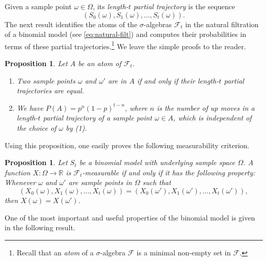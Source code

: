 \documentclass[11pt, openany, oneside]{book}
\newtheorem{prop}[thm]{Proposition}
\theoremstyle{definition}
\theoremstyle{remark}
\theoremstyle{boldital}
\numberwithin{equation}{section}
\begin{document}
Given a sample point $\omega\in \Omega$, its \textit{length-$t$ partial trajectory} is the sequence
	\[
	(S_0(\omega), S_1(\omega),\ldots,S_t(\omega)).
	\]
The next result identifies the atoms of the $\sigma$-algebras $\mathcal{F}_t$ in the natural filtration of a binomial model (see \eqref{eq:natural-filt}) and computes their probabilities in terms of these partial trajectories.\footnote{Recall that an \textit{atom} of a $\sigma$-algebra $\mathcal{F}$ is a minimal non-empty set in $\mathcal{F}$.} We leave the simple proofs to the reader.

\begin{prop}\label{prop:atom-prob}
Let $A$ be an atom of $\mathcal{F}_t$.
\begin{enumerate}
\item Two sample points $\omega$ and $\omega'$ are in $A$ if and only if their length-$t$ partial trajectories are equal.
\item We have $P(A) = p^n (1-p)^{t-n}$, where $n$ is the number of up moves in a length-$t$ partial trajectory of a sample point $\omega \in A$, which is independent of the choice of $\omega$ by \textnormal{(1)}.
\end{enumerate}
\end{prop}

Using this proposition, one easily proves the following measurability criterion.

\begin{prop}
Let $S_t$ be a binomial model with underlying sample space $\Omega$. A function $X: \Omega \to \mathbb{R}$ is $\mathcal{F}_t$-measurable if and only if it has the following property: Whenever $\omega$ and $\omega'$ are sample points in $\Omega$ such that
	\[
	(X_0(\omega), X_1(\omega), \ldots, X_t(\omega)) = (X_0(\omega'), X_1(\omega'), \ldots, X_t(\omega')),
	\] 
then $X(\omega) = X(\omega')$. \qedhere
\end{prop}

One of the most important and useful properties of the binomial model is given in the following result.
\end{document}
